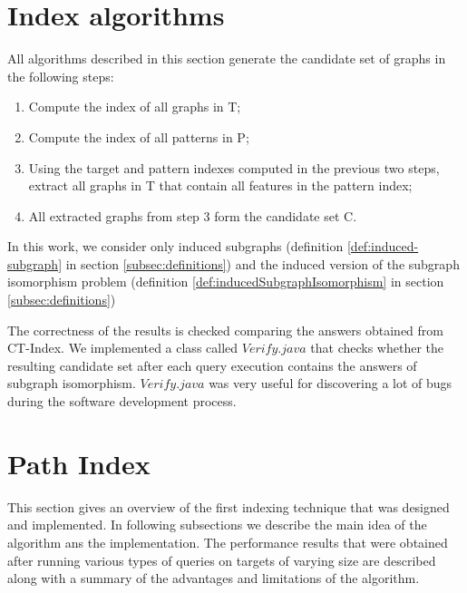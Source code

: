 \documentclass{l4proj}
\theoremstyle{definition}
\begin{document}


\section{Index algorithms}

    All algorithms described in this section generate the candidate set of graphs in the following steps:
    
    \begin{enumerate}
        \label{indexSteps}
        \item Compute the index of all graphs in T;
        \item Compute the index of all patterns in P;
        \item Using the target and pattern indexes computed in the previous two steps, extract all graphs in T that contain all features in the pattern index;
        \item All extracted graphs from step 3 form the candidate set C.
	\end{enumerate}
    
    In this work, we consider only induced subgraphs (definition \ref{def:induced-subgraph} in section \ref{subsec:definitions}) and the induced version of the subgraph isomorphism problem (definition \ref{def:inducedSubgraphIsomorphism} in section \ref{subsec:definitions})
    
    The correctness of the results is checked comparing the answers obtained from CT-Index. We implemented a class called $Verify.java$ that checks whether the resulting candidate set after each query execution contains the answers of subgraph isomorphism. $Verify.java$ was very useful for discovering a lot of bugs during the software development process.
\section{Path Index}
\label{path-index}
This section gives an overview of the first indexing technique that was designed and implemented. In following subsections we describe the main idea of the algorithm ans the implementation. The performance results that were obtained after running various types of queries on targets of varying size are described along with a summary of the advantages and limitations of the algorithm.\par
\end{document}
